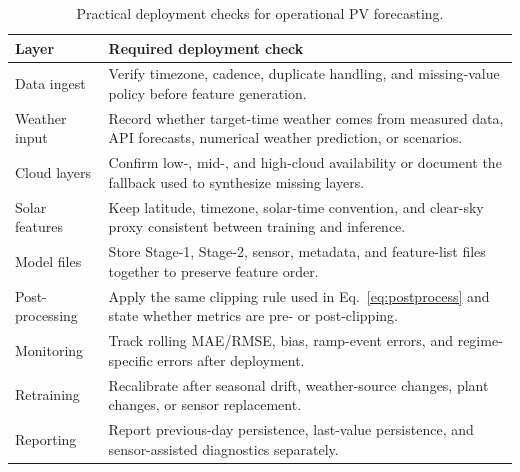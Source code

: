 \begin{table}[!t]
\caption{Practical deployment checks for operational PV forecasting.}
\label{tab:deployment_checklist}
\centering
\scriptsize
\setlength{\tabcolsep}{3pt}
\begin{tabularx}{\columnwidth}{@{}>{\raggedright\arraybackslash}p{}>{\raggedright\arraybackslash}X@{}}
\toprule
Layer & Required deployment check \\
\midrule
Data ingest & Verify timezone, cadence, duplicate handling, and missing-value policy before feature generation. \\
Weather input & Record whether target-time weather comes from measured data, API forecasts, numerical weather prediction, or scenarios. \\
Cloud layers & Confirm low-, mid-, and high-cloud availability or document the fallback used to synthesize missing layers. \\
Solar features & Keep latitude, timezone, solar-time convention, and clear-sky proxy consistent between training and inference. \\
Model files & Store Stage-1, Stage-2, sensor, metadata, and feature-list files together to preserve feature order. \\
Post-processing & Apply the same clipping rule used in Eq.~\eqref{eq:postprocess} and state whether metrics are pre- or post-clipping. \\
Monitoring & Track rolling MAE/RMSE, bias, ramp-event errors, and regime-specific errors after deployment. \\
Retraining & Recalibrate after seasonal drift, weather-source changes, plant changes, or sensor replacement. \\
Reporting & Report previous-day persistence, last-value persistence, and sensor-assisted diagnostics separately. \\
\bottomrule
\end{tabularx}
\end{table}

